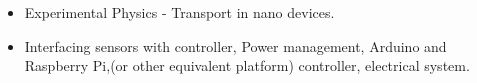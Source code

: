 \begin{itemize}
    \item Experimental Physics - Transport in nano devices. 
    \item Interfacing sensors with controller, Power management,   Arduino and Raspberry Pi,(or other equivalent platform) controller, electrical system.

\end{itemize}
